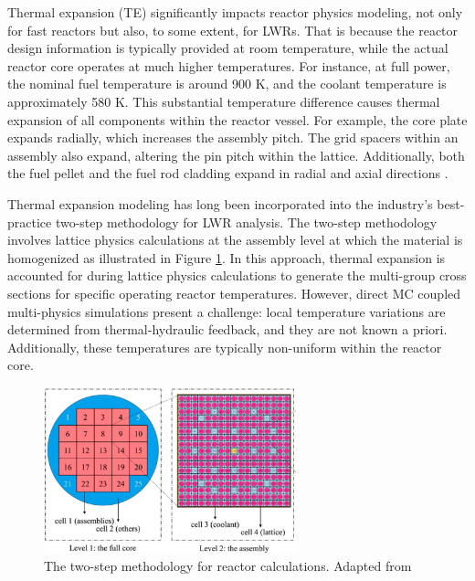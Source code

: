 Thermal expansion (TE) significantly impacts reactor physics modeling, not only for fast reactors but also, to some extent, for LWRs. That is because the reactor design information is typically provided at room temperature, while the actual reactor core operates at much higher temperatures. For instance, at full power, the nominal fuel temperature is around 900 K, and the coolant temperature is approximately 580 K. This substantial temperature difference causes thermal expansion of all components within the reactor vessel. For example, the core plate expands radially, which increases the assembly pitch. The grid spacers within an assembly also expand, altering the pin pitch within the lattice. Additionally, both the fuel pellet and the fuel rod cladding expand in radial and axial directions \cite{palmtag}.

Thermal expansion modeling has long been incorporated into the industry's best-practice two-step methodology for LWR analysis. The two-step methodology involves lattice physics calculations at the assembly level at which the material is homogenized as illustrated in Figure \ref{fig_1x}. In this approach, thermal expansion is accounted for during lattice physics calculations to generate the multi-group cross sections for specific operating reactor temperatures. However, direct MC coupled multi-physics simulations present a challenge: local temperature variations are determined from thermal-hydraulic feedback, and they are not known a priori. Additionally, these temperatures are typically non-uniform within the reactor core.

\begin{figure}
    \centering
    \includegraphics[width=0.65\textwidth]{figs/two_step.png}
    \caption[The two-step methodology for reactor calculations.]{The two-step methodology for reactor calculations. Adapted from \cite{li_2023}}
    \label{fig_1x}
\end{figure}

